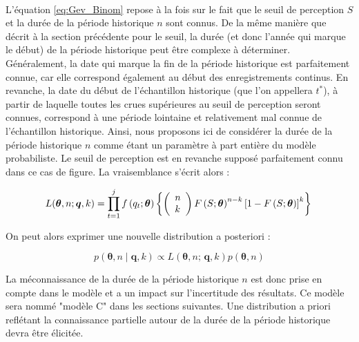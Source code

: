 		\paragraph{}
		L'équation \ref{eq:Gev_Binom} repose à la fois sur le fait que le seuil de perception $S$ et la durée de la période historique $n$ sont connus. De la même manière que décrit à la section précédente pour le seuil, la durée (et donc l'année qui marque le début) de la période historique peut être complexe à déterminer. Généralement, la date qui marque la fin de la période historique est parfaitement connue, car elle correspond également au début des enregistrements continus. En revanche, la date du début de l'échantillon historique (que l'on appellera $t^{*}$), à partir de laquelle toutes les crues supérieures au seuil de perception seront connues, correspond à une période lointaine et relativement mal connue de l'échantillon historique. Ainsi, nous proposons ici de considérer la durée de la période historique $n$ comme étant un paramètre à part entière du modèle probabiliste. Le seuil de perception est en revanche supposé parfaitement connu dans ce cas de figure. La vraisemblance s'écrit alors : 
		 
				\begin{equation}
				L(\boldsymbol{\theta}, n ; \boldsymbol{q}, k) = \prod_{t=1}^j f\left(q_t;\boldsymbol{\theta}\right) \left\{\left(\begin{array}{l}
				n \\
				k
				\end{array}\right) F\left(S;\boldsymbol{\theta}\right)^{n-k}\left[1-F\left(S;\boldsymbol{\theta}\right)\right]^k\right\} \\
				\label{eq:Gev_Binom_uN}
				\end{equation}
				
		On peut alors exprimer une nouvelle distribution a posteriori :
		
				\begin{equation}
					p(\boldsymbol{\theta}, n \mid \boldsymbol{q},k) \propto L(\boldsymbol{\theta},n;\,\boldsymbol{q},k) p(\boldsymbol{\theta},n)
					\label{eq:Bayes_uN}
				\end{equation}
			
		La méconnaissance de la durée de la période historique $n$ est donc prise en compte dans le modèle et a un impact sur l'incertitude des résultats. Ce modèle sera nommé "modèle C" dans les sections suivantes. Une distribution a priori reflétant la connaissance partielle autour de la durée de la période historique devra être élicitée. 
	
